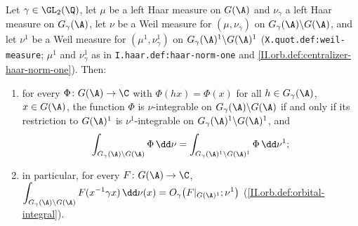 Let $\gamma\in\GL_2(\Q)$, let $\mu$ be a left Haar measure on $G(\A)$ and $\nu_\gamma$ a left Haar measure on $G_\gamma(\A)$, let $\nu$ be a Weil measure for
$(\mu,\nu_\gamma)$ on $G_\gamma(\A)\backslash G(\A)$, and let $\nu^1$ be a Weil measure for $(\mu^1,\nu_\gamma^1)$ on $G_\gamma(\A)^1\backslash G(\A)^1$
(\texttt{X.quot.def:weil-measure}; $\mu^1$ and $\nu_\gamma^1$ as in \texttt{I.haar.def:haar-norm-one} and \cref{II.orb.def:centralizer-haar-norm-one}). Then:
\begin{enumerate}
  \item[(a)] for every $\Phi\colon G(\A)\to\C$ with $\Phi(hx)=\Phi(x)$ for all $h\in G_\gamma(\A)$, $x\in G(\A)$, the function $\Phi$ is $\nu$-integrable on
  $G_\gamma(\A)\backslash G(\A)$ if and only if its restriction to $G(\A)^1$ is $\nu^1$-integrable on $G_\gamma(\A)^1\backslash G(\A)^1$, and
  \[
    \int_{G_\gamma(\A)\backslash G(\A)}\Phi\,\dd\nu=\int_{G_\gamma(\A)^1\backslash G(\A)^1}\Phi\,\dd\nu^1 ;
  \]
  \item[(b)] in particular, for every $F\colon G(\A)\to\C$,
  $\displaystyle\int_{G_\gamma(\A)\backslash G(\A)}F(x^{-1}\gamma x)\,\dd\nu(x)=O_\gamma\bigl(F|_{G(\A)^1};\nu^1\bigr)$ (\cref{II.orb.def:orbital-integral}).
\end{enumerate}

